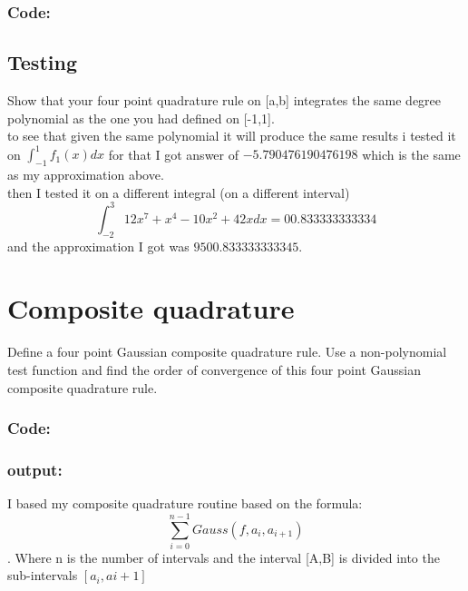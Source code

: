 \documentclass{article}
\begin{document}
	\subsubsection*{Code:}
		
	\subsection{Testing}
		Show that your four point quadrature rule on [a,b] integrates the same degree polynomial as the one you had defined on [-1,1].\\ 
		
		to see that given the same polynomial it will produce the same results i tested it on $\int_{-1}^1f_1(x)dx$ for that I got answer of $-5.790476190476198$ which is the same as my approximation above.\\
		then I tested it on a different integral (on a different interval) 
		$$\int_{-2}^{3} 12x^7 + x^4 - 10x^2+ 42x dx =00.833333333334$$
		 and the approximation I got was $9500.833333333345$.
		 


\section{Composite quadrature}
	Define a four point Gaussian composite quadrature rule. Use a non-polynomial test
	function and find the order of convergence of this four point Gaussian composite
	quadrature rule. 
	\subsubsection*{Code:}
		
	\subsubsection*{output:}
	I based my composite quadrature routine based on the formula: $$\sum_{i=0}^{n-1}Gauss(f,a_{i}, a_{i+1})$$. Where n is the number of intervals and the interval [A,B] is divided into the sub-intervals $[a_{i},a{i+1}]$
	
	
\end{document}
